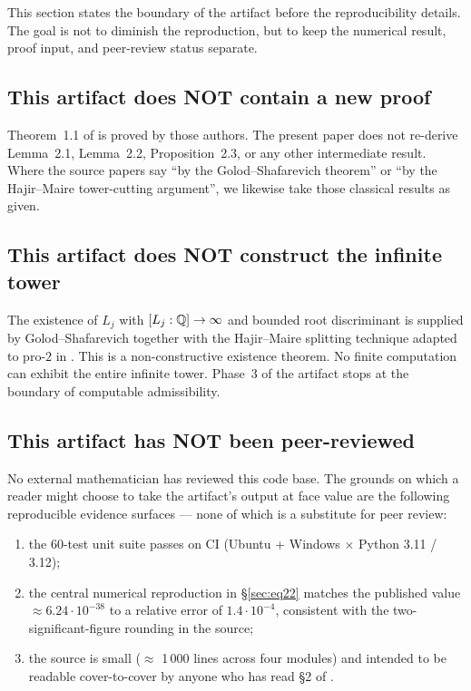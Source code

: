 
This section states the boundary of the artifact before the
reproducibility details. The goal is not to diminish the reproduction,
but to keep the numerical result, proof input, and peer-review status
separate.

\subsection{This artifact does NOT contain a new proof}

Theorem~1.1 of \cite{OpenAI2026Proof,Sawin2026Remarks} is proved by
those authors. The present paper does not re-derive Lemma~2.1,
Lemma~2.2, Proposition~2.3, or any other intermediate result. Where the
source papers say ``by the Golod--Shafarevich theorem'' or ``by the
Hajir--Maire tower-cutting argument'', we likewise take those classical
results as given.

\subsection{This artifact does NOT construct the infinite tower}

The existence of $L_j$ with $[L_j : \mathbb{Q}] \to \infty$ and bounded root
discriminant is supplied by Golod--Shafarevich
\cite{GolodShafarevich1964} together with the Hajir--Maire splitting
technique \cite{HajirMaire2001} adapted to pro-$2$ in
\cite{Sawin2026Remarks}. This is a non-constructive existence theorem.
No finite computation can exhibit the entire infinite tower. Phase~3
of the artifact stops at the boundary of computable
admissibility.

\subsection{This artifact has NOT been peer-reviewed}

No external mathematician has reviewed this code base. The grounds on
which a reader might choose to take the artifact's output at face value
are the following reproducible evidence surfaces --- none of which is a
substitute for peer review:

\begin{enumerate}[leftmargin=*]
  \item the $60$-test unit suite passes on CI (Ubuntu + Windows
        $\times$ Python 3.11 / 3.12);
  \item the central numerical reproduction in \S\ref{sec:eq22} matches
        the published value $\approx 6.24 \cdot 10^{-38}$ to a relative
        error of $1.4 \cdot 10^{-4}$, consistent with the
        two-significant-figure rounding in the source;
  \item the source is small (\(\approx\) 1\,000 lines across four
        modules) and intended to be readable cover-to-cover by anyone
        who has read \S2 of \cite{Sawin2026Remarks}.
\end{enumerate}

